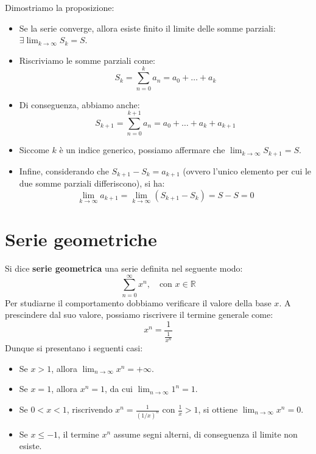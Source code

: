 \documentclass[12pt]{report}
\begin{document}
	\begin{dimostrazione}{}{}
		
		Dimostriamo la proposizione:
		\begin{itemize}
			
			\item Se la serie converge, allora esiste finito il limite delle somme parziali: $\exists \lim_{k\to\infty} S_k = S$.
			
			\item Riscriviamo le somme parziali come:
			\[
			S_k = \sum_{n=0}^{k} a_n = a_0 + \dots + a_k
			\]
			
			\item Di conseguenza, abbiamo anche:
			\[
			S_{k+1} = \sum_{n=0}^{k+1} a_n = a_0 + \dots + a_k + a_{k+1}
			\]
			
			\item Siccome $k$ è un indice generico, possiamo affermare che $\lim_{k\to\infty} S_{k+1} = S$.
			
			\item Infine, considerando che $S_{k+1} - S_k = a_{k+1}$ (ovvero l'unico elemento per cui le due somme parziali differiscono), si ha:
			\[
			\lim_{k\to\infty} a_{k+1} = \lim_{k\to\infty} (S_{k+1} - S_k) = S - S = 0
			\]
			
		\end{itemize}
		
	\end{dimostrazione}
	
	\section{Serie geometriche}
	
	Si dice \textbf{serie geometrica} una serie definita nel seguente modo:
	\[
	\sum_{n=0}^{\infty} x^n, \quad \text{con } x \in \mathbb{R}
	\]
	Per studiarne il comportamento dobbiamo verificare il valore della base $x$. A prescindere dal suo valore, possiamo riscrivere il termine generale come:
	\[
	x^n = \frac{1}{\frac{1}{x^n}}
	\]
	Dunque si presentano i seguenti casi:
	\begin{itemize}
		
		\item Se $x > 1$, allora $\lim_{n\to\infty} x^n = +\infty$.
		
		\item Se $x = 1$, allora $x^n = 1$, da cui $\lim_{n\to\infty} 1^n = 1$.
		
		\item Se $0 < x < 1$, riscrivendo $x^n = \frac{1}{(1/x)^n}$ con $\frac{1}{x} > 1$, si ottiene $\lim_{n\to\infty} x^n = 0$.
		
		\item Se $x \le -1$, il termine $x^n$ assume segni alterni, di conseguenza il limite non esiste.
		
	\end{itemize}
	
\end{document}

